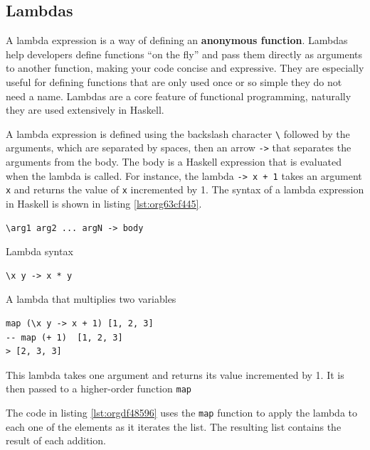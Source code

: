 \documentclass[a4paper, titlepage, twoside]{article}
\begin{document}
\subsection{Lambdas}
\label{sec:orgd21e722}

A lambda expression is a way of defining an \textbf{anonymous function}. Lambdas help developers define functions ``on the fly'' and pass them directly as arguments to another function, making your code concise and expressive. They are especially useful for defining functions that are only used once or so simple they do not need a name. Lambdas are a core feature of functional programming, naturally they are used extensively in Haskell.

A lambda expression is defined using the backslash character \texttt{\textbackslash{}} followed by the arguments, which are separated by spaces, then an arrow \texttt{->} that separates the arguments from the body. The body is a Haskell expression that is evaluated when the lambda is called. For instance, the lambda \texttt{\x -> x + 1} takes an argument \texttt{x} and returns the value of \texttt{x} incremented by 1. The syntax of a lambda expression in Haskell is shown in listing \ref{lst:org63cf445}.

\begin{listing}[htbp]
\begin{verbatim}
\arg1 arg2 ... argN -> body
\end{verbatim}
\caption{\label{lst:org63cf445}Lambda syntax}
\end{listing}

\begin{listing}[htbp]
\begin{verbatim}
\x y -> x * y
\end{verbatim}
\caption{A lambda that multiplies two variables}
\end{listing}

\begin{listing}[htbp]
\begin{verbatim}
map (\x y -> x + 1) [1, 2, 3]
-- map (+ 1)  [1, 2, 3]
> [2, 3, 3]
\end{verbatim}
\caption[higher-order lambda]{\label{lst:orgdf48596}This lambda takes one argument and returns its value incremented by 1. It is then passed to a higher-order function \texttt{map}}
\end{listing}

The code in listing \ref{lst:orgdf48596} uses the \texttt{map} function to apply the lambda to each one of the elements as it iterates the list. The resulting list contains the result of each addition.
\end{document}
